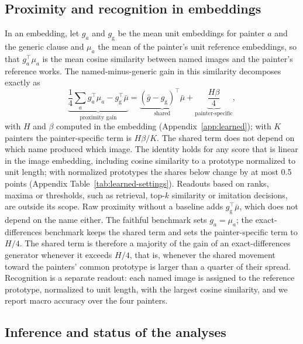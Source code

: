 \documentclass[10pt]{article}
\begin{document}
\subsection{Proximity and recognition in embeddings}\label{sec:proximity}

In an embedding, let $g_a$ and $g_{\mathrm{g}}$ be the mean unit embeddings for painter $a$ and the
generic clause and $\mu_a$ the mean of the painter's unit reference embeddings, so that
$g_a^\top\mu_a$ is the mean cosine similarity between named images and the painter's reference
works. The named-minus-generic gain in this similarity decomposes exactly as
\begin{equation}
\underbrace{\frac14\sum_a g_a^\top\mu_a-g_{\mathrm{g}}^\top\bar\mu}_{\text{proximity gain}}
=\underbrace{(\bar g-g_{\mathrm{g}})^\top\bar\mu}_{\text{shared}}
+\underbrace{\frac{H\beta}{4}}_{\text{painter-specific}},
\label{eq:prototype-gain}
\end{equation}
with $H$ and $\beta$ computed in the embedding (Appendix~\ref{app:learned}); with $K$ painters the
painter-specific term is $H\beta/K$. The shared term does
not depend on which name produced which image. The identity holds for any score that is linear in
the image embedding, including cosine similarity to a prototype normalized to unit length; with
normalized prototypes the shares below change by at most 0.5 points
(Appendix Table~\ref{tab:learned-settings}). Readouts based on ranks, maxima or thresholds, such as
retrieval, top-$k$ similarity or imitation decisions, are outside its scope. Raw proximity without a baseline adds
$g_{\mathrm{g}}^\top\bar\mu$, which does not depend on the name either. The faithful benchmark sets
$g_a=\mu_a$; the exact-differences benchmark keeps the shared term and sets the painter-specific
term to $H/4$. The shared term is therefore a majority of the gain of an exact-differences
generator whenever it exceeds $H/4$, that is, whenever the shared movement toward the painters'
common prototype is larger than a quarter of their spread. Recognition is a separate readout: each
named image is assigned to the reference prototype, normalized to unit length, with the largest
cosine similarity, and we report macro accuracy over the four painters.

\subsection{Inference and status of the analyses}\label{sec:inference}
\end{document}
